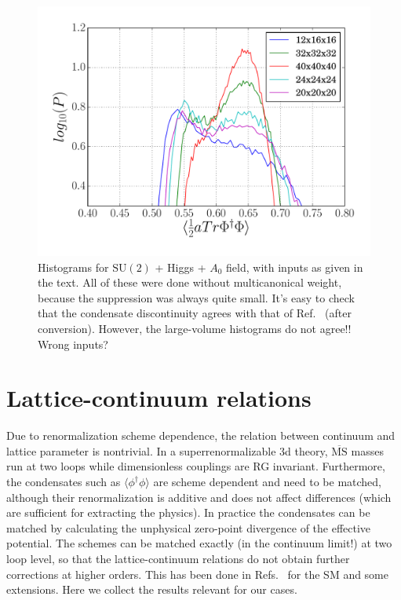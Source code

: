 \documentclass[11pt,a4paper]{article}
\newcommand\MSbar{$\overline{\text{MS}}$ } %
\newcommand\gr[1]{\mathrm{#1}}%
\newcommand\lauri[1]{{\color{myorange}#1}}
\begin{document}
\begin{figure}[H]
	\includegraphics[scale=0.5]{hgrams_SM+A0}
	\caption{Histograms for $\gr{SU(2)}$ + Higgs + $A_0$ field, with inputs as given in the text. All of these were done without multicanonical weight, because the suppression was always quite small. It's easy to check that the condensate discontinuity agrees with that of Ref.~\cite{Kajantie:1995kf} (after conversion). \lauri{However, the large-volume histograms do not agree!! Wrong inputs?}}
\label{fig:hgrams_SM_A0}
\end{figure}


\appendix 

\section{Lattice-continuum relations}
\label{sec:lat-cont}

Due to renormalization scheme dependence, the relation between continuum and lattice parameter is nontrivial. In a superrenormalizable 3d theory, \MSbar masses run at two loops while dimensionless couplings are RG invariant. Furthermore, the condensates such as $\langle \phi^\dagger\phi \rangle$ are scheme dependent and need to be matched, although their renormalization is additive and does not affect differences (which are sufficient for extracting the physics). In practice the condensates can be matched by calculating the unphysical zero-point divergence of the effective potential. The schemes can be matched exactly (in the continuum limit!) at two loop level, so that the lattice-continuum relations do not obtain further corrections at higher orders. This has been done in Refs.~\cite{Laine:1995np, Laine:1997dy} for the SM and some extensions. Here we collect the results relevant for our cases.
\end{document}
